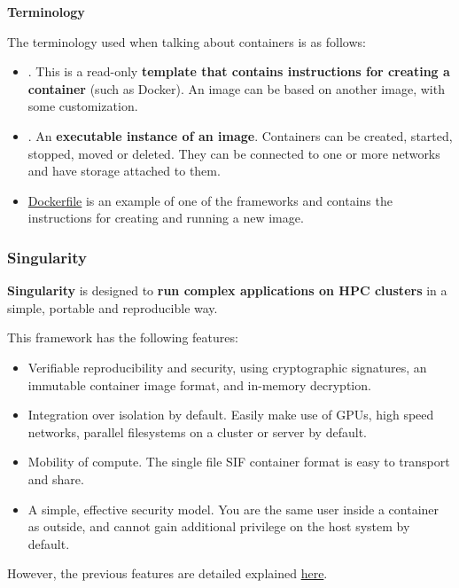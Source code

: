 \begin{flushleft}
    \textcolor{Green3}{ \textbf{Terminology}}
\end{flushleft}
The terminology used when talking about containers is as follows:
\begin{itemize}
    \item {}. This is a read-only \textbf{template that contains instructions for creating a container} (such as Docker). An image can be based on another image, with some customization.

    \item {}. An \textbf{executable instance of an image}. Containers can be created, started, stopped, moved or deleted. They can be connected to one or more networks and have storage attached to them.

    \item \href{https://docs.docker.com/get-started/02_our_app/}{Dockerfile} is an example of one of the frameworks and contains the instructions for creating and running a new image.
\end{itemize}

\newpage

\subsubsection{Singularity}

\textbf{Singularity} is designed to \textbf{run complex applications on HPC clusters} in a simple, portable and reproducible way.

\highspace
This framework has the following features:
\begin{itemize}
    \item Verifiable reproducibility and security, using cryptographic signatures, an immutable container image format, and in-memory decryption.

    \item Integration over isolation by default. Easily make use of GPUs, high speed networks, parallel filesystems on a cluster or server by default.

    \item Mobility of compute. The single file SIF container format is easy to transport and share.

    \item A simple, effective security model. You are the same user inside a container as outside, and cannot gain additional privilege on the host system by default.
\end{itemize}
However, the previous features are detailed explained \href{https://docs.sylabs.io/guides/latest/user-guide/introduction.html#why-use-singularityce}{here}.

